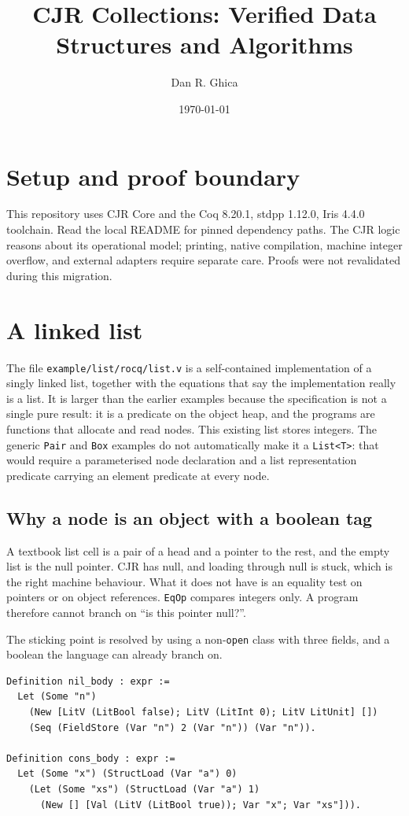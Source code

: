\documentclass[11pt]{article}
\title{CJR Collections: Verified Data Structures and Algorithms}
\author{Dan R. Ghica}
\date{\today}
\newcommand{\cjr}{CJR}
\begin{document}
\maketitle
\tableofcontents
\clearpage
\section{Setup and proof boundary}
This repository uses CJR Core and the Coq 8.20.1, stdpp 1.12.0, Iris 4.4.0 toolchain. Read the local README for pinned dependency paths. The CJR logic reasons about its operational model; printing, native compilation, machine integer overflow, and external adapters require separate care. Proofs were not revalidated during this migration.
\section{A linked list}

The file \texttt{example/list/rocq/list.v} is a self-contained implementation of a singly linked list, together with the equations that say the implementation really is a list.
It is larger than the earlier examples because the specification is not a single pure result: it is a predicate on the object heap, and the programs are functions that allocate and read nodes.
This existing list stores integers. The generic \texttt{Pair} and
\texttt{Box} examples do not automatically make it a \texttt{List<T>}:
that would require a parameterised node declaration and a list
representation predicate carrying an element predicate at every node.

\subsection{Why a node is an object with a boolean tag}

A textbook list cell is a pair of a head and a pointer to the rest, and the empty list is the null pointer.
\cjr{} has null, and loading through null is stuck, which is the right machine behaviour.
What it does not have is an equality test on pointers or on object references.
\texttt{EqOp} compares integers only.
A program therefore cannot branch on ``is this pointer null?''.

The sticking point is resolved by using a non-\texttt{open} class with three fields, and a boolean the language can already branch on.

\begin{lstlisting}
Definition nil_body : expr :=
  Let (Some "n")
    (New [LitV (LitBool false); LitV (LitInt 0); LitV LitUnit] [])
    (Seq (FieldStore (Var "n") 2 (Var "n")) (Var "n")).

Definition cons_body : expr :=
  Let (Some "x") (StructLoad (Var "a") 0)
    (Let (Some "xs") (StructLoad (Var "a") 1)
      (New [] [Val (LitV (LitBool true)); Var "x"; Var "xs"])).
\end{lstlisting}
\end{document}
